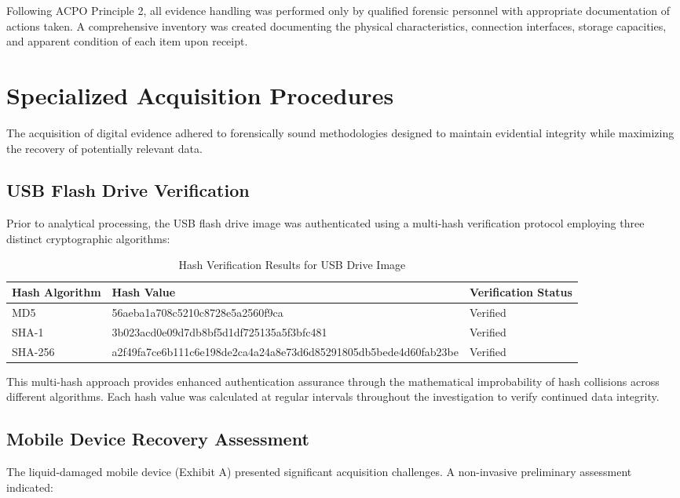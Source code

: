 Following ACPO Principle 2, all evidence handling was performed only by qualified forensic personnel with appropriate documentation of actions taken. A comprehensive inventory was created documenting the physical characteristics, connection interfaces, storage capacities, and apparent condition of each item upon receipt.

\section{Specialized Acquisition Procedures}
The acquisition of digital evidence adhered to forensically sound methodologies designed to maintain evidential integrity while maximizing the recovery of potentially relevant data.

\subsection{USB Flash Drive Verification}
Prior to analytical processing, the USB flash drive image was authenticated using a multi-hash verification protocol employing three distinct cryptographic algorithms:

\begin{table}[htbp]
\centering
\small
\begin{tabular}{|p{3cm}|p{8cm}|p{3cm}|}
\hline
\textbf{Hash Algorithm} & \textbf{Hash Value} & \textbf{Verification Status} \\
\hline
MD5 & 56aeba1a708c5210c8728e5a2560f9ca  & Verified \\
\hline
SHA-1 & 3b023acd0e09d7db8bf5d1df725135a5f3bfc481 & Verified \\
\hline
SHA-256 & \tiny{a2f49fa7ce6b111c6e198de2ca4a24a8e73d6d85291805db5bede4d60fab23be}  & Verified \\
\hline
\end{tabular}
\caption{Hash Verification Results for USB Drive Image}
\label{tab:hash_verification_acq}
\end{table}

This multi-hash approach provides enhanced authentication assurance through the mathematical improbability of hash collisions across different algorithms. Each hash value was calculated at regular intervals throughout the investigation to verify continued data integrity.

\subsection{Mobile Device Recovery Assessment}
The liquid-damaged mobile device (Exhibit A) presented significant acquisition challenges. A non-invasive preliminary assessment indicated:

